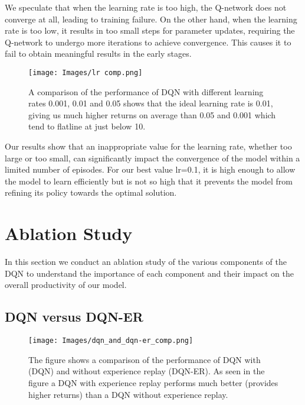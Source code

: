 \documentclass{article}
\begin{document}
We speculate that when the learning rate is too high, the Q-network does not converge at all, leading to training failure. On the other hand, when the learning rate is too low, it results in too small steps for parameter updates, requiring the Q-network to undergo more iterations to achieve convergence. This causes it to fail to obtain meaningful results in the early stages.\\
\begin{figure}[htbp]
\centering
\texttt{[image: Images/lr comp.png]}
\caption{\label{fig:Analysis of Learning Rates}A comparison of the performance of DQN with different learning rates 0.001, 0.01 and 0.05 shows that the ideal learning rate is 0.01, giving us much higher returns on average than 0.05 and 0.001 which tend to flatline at just below 10.}
\end{figure}

Our results show that an inappropriate value for the learning rate, whether too large or too small, can significantly impact the convergence of the model within a limited number of episodes. For our best value lr=0.1, it is high enough to allow the model to learn efficiently but is not so high that it prevents the model from refining its policy towards the optimal solution.\\



\section{Ablation Study}
In this section we conduct an ablation study of the various components of the DQN to understand the importance of each component and their impact on the overall productivity of our model. 


\subsection{DQN versus DQN-ER}

\begin{figure}[htbp]
\centering
\texttt{[image: Images/dqn\_and\_dqn-er\_comp.png]}
\caption{\label{fig:Analysis of Experience Replay}The figure shows a comparison of the performance of DQN with (DQN) and without experience replay (DQN-ER). As seen in the figure a DQN with experience replay performs much better (provides higher returns) than a DQN without experience replay. }
\end{figure}
\end{document}
